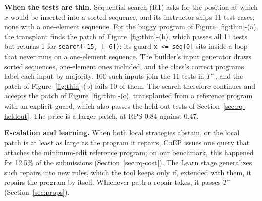 \documentclass[acmsmall,screen,review,anonymous,nonacm]{acmart}
\newcommand{\tool}{\textsc{CoEP}\xspace}
\begin{document}
\textbf{When the tests are thin.} Sequential search (R1) asks for the position at which $x$ would be inserted into a sorted sequence, and its instructor ships 11 test cases, none with a one-element sequence. For the buggy program of Figure~\ref{fig:thin}-(a), the transplant finds the patch of Figure~\ref{fig:thin}-(b), which passes all 11 tests but returns 1 for \texttt{search(-15, [-6])}: its guard \texttt{x <= seq[0]} sits inside a loop that never runs on a one-element sequence. The builder's input generator draws sorted sequences, one-element ones included, and the class's correct programs label each input by majority. 100 such inputs join the 11 tests in $T^{+}$, and the patch of Figure~\ref{fig:thin}-(b) fails 10 of them. The search therefore continues and accepts the patch of Figure~\ref{fig:thin}-(c), transplanted from a reference program with an explicit guard, which also passes the held-out tests of Section~\ref{sec:rq-heldout}. The price is a larger patch, at RPS 0.84 against 0.47.

\textbf{Escalation and learning.} When both local strategies abstain, or the local patch is at least as large as the program it repairs, \tool issues one query that attaches the minimum-edit reference program; on our benchmark, this happened for 12.5\% of the submissions (Section~\ref{sec:rq-cost}). The Learn stage generalizes such repairs into new rules, which the tool keeps only if, extended with them, it repairs the program by itself. Whichever path a repair takes, it passes $T^{+}$ (Section~\ref{sec:props}).
\end{document}

